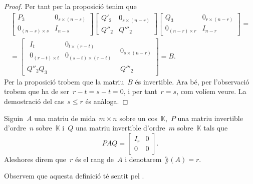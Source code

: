 \documentclass[../../main.tex]{subfiles}
\begin{document}
\begin{theorem}
\begin{proof}
			Per tant per la proposició  tenim que
			\begin{multline*}
			\left[\begin{array}{c|c}
			P_{3} & 0_{s\times(n-s)} \\\hline
			0_{(n-s)\times s} & I_{n-s}
			\end{array}\right]
			\left[\begin{array}{c|c}
			Q'_{2} & 0_{s\times(n-r)} \\\hline
			Q''_{2} & Q'''_{2}
			\end{array}\right]
			\left[\begin{array}{c|c}
			Q_{3} & 0_{r\times(n-r)} \\\hline
			0_{(n-r)\times r} & I_{n-r}
			\end{array}\right]=\\=
			\left[\begin{array}{c|c}
				\begin{array}{c|c}
				I_{t} & 0_{t\times(r-t)} \\\hline
				0_{(r-t)\times t} & 0_{(s-t)\times(r-t)}
				\end{array}
			& 0_{s\times(n-r)} \\\hline
			Q''_{2}Q_{3} & Q'''_{2}
			\end{array}\right]=B.
			\end{multline*}
			Per la proposició  trobem que la matriu~\(B\) és invertible.
			Ara bé, per l'observació  trobem que ha de ser~\(r-t=s-t=0\), i per tant~\(r=s\), com volíem veure.
			La demostració del cas~\(s\leq r\) és anàloga.
		\end{proof}
	\end{theorem}
	\begin{definition}[Rang]
		\label{def:rang d'una matriu}
		Siguin~\(A\) una matriu de mida~\(m\times n\) sobre un cos~\(\mathbb{K}\),~\(P\) una matriu invertible d'ordre~\(n\) sobre~\(\mathbb{K}\) i~\(Q\) una matriu invertible d'ordre~\(m\) sobre~\(\mathbb{K}\) tals que
		\[PAQ=\left[\begin{array}{c|c}
		I_{r} & 0 \\\hline
		0 & 0
		\end{array}\right].\]
		Aleshores direm que~\(r\) és el rang de~\(A\) i denotarem~\(\rang(A)=r\).

		Observem que aquesta definició té sentit pel .
	\end{definition}
\end{document}
